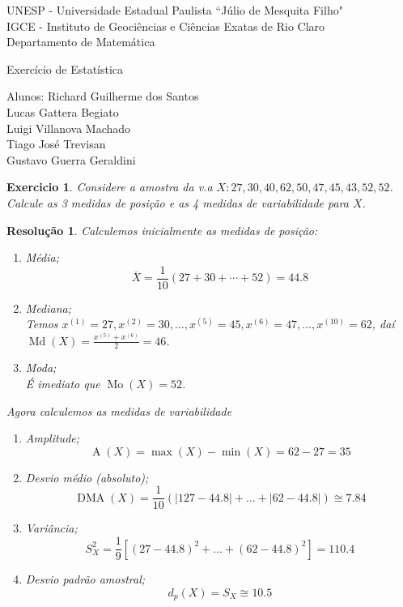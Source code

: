 \documentclass[12pt,				%
	openright,			%
	oneside,			%
	a4paper,			%
	english,			%
	french,				%
	spanish,			%
	brazil,				%
	]{abntex2}
\newtheorem{exercicio}{Exercicio}
\newtheorem{resolucao}{Resolução}
\DeclareMathOperator{\Mo}{Mo}
\DeclareMathOperator{\Md}{Md}
\DeclareMathOperator{\A}{A}
\DeclareMathOperator{\DMA}{DMA}
\begin{document}
\begin{center}
\thispagestyle{empty}
UNESP - Universidade Estadual Paulista ``Júlio de Mesquita Filho"\\
IGCE - Instituto de Geociências e Ciências Exatas de Rio Claro\\
Departamento de Matemática
\vspace{7.0cm} 

{\Large Exercício de Estatística}

\vspace{3.0cm}

{Alunos: Richard Guilherme dos Santos\\
Lucas Gattera Begiato \\
Luigi Villanova Machado \\
Tiago José Trevisan \\
Gustavo Guerra Geraldini}
\vspace{10.0cm}
\end{center}

\newpage 

\begin{exercicio} Considere a amostra da v.a $X:27,30,40,62,50,47,45,43,52,52$. Calcule as 3 medidas de posição e as 4 medidas de variabilidade para $X$.
\end{exercicio}

\begin{resolucao}
Calculemos inicialmente as medidas de posição:
\begin{enumerate}
	\item Média;
	$$ \overline{X} = \dfrac{1}{10}(27+30+\cdots+52) = 44.8 $$
	\item Mediana; \\
	Temos $x^{(1)} = 27, x^{(2)}=30, \dots, x^{(5)}=45, x^{(6)}=47, \dots , x^{(10)} = 62$, daí $\Md(X)= \frac{ x^{(5)} + x^{(6)}}{2} = 46$.
	\item Moda; \\
	É imediato que $\Mo(X)=52$.
\end{enumerate}
Agora calculemos as medidas de variabilidade
\begin{enumerate}
	\item Amplitude;
	$$\A(X)=\max(X) - \min(X) = 62-27=35$$
	\item Desvio médio (absoluto);
	$$\DMA(X) = \frac{1}{10}(|127-44.8|+\dots+|62-44.8|)\cong 7.84$$
	\item Variância;
	$$S_X^2 = \frac{1}{9}[(27-44.8)^2 +\dots + (62-44.8)^2] = 110.4$$
	\item Desvio padrão amostral;
	$$ d_p(X) = S_X \cong 10.5$$
\end{enumerate}
\end{resolucao}
\end{document}

